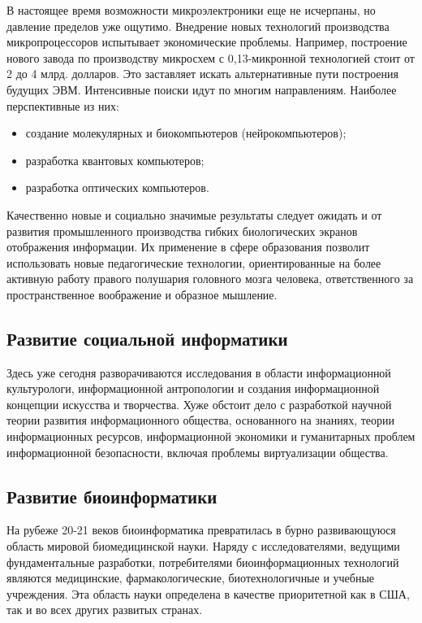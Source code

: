 В настоящее время возможности микроэлектроники еще не исчерпаны, но давление пределов уже ощутимо. Внедрение новых технологий производства микропроцессоров испытывает экономические проблемы. Например, построение нового завода по производству микросхем с 0,13-микронной технологией стоит от 2 до 4 млрд. долларов. Это заставляет искать альтернативные пути построения будущих ЭВМ. Интенсивные поиски идут по многим направлениям. Наиболее перспективные из них:
\begin{itemize}
\item создание молекулярных и биокомпьютеров (нейрокомпьютеров);
\item разработка квантовых компьютеров;
\item разработка оптических компьютеров.
\end{itemize}

Качественно новые и социально значимые результаты следует ожидать и от развития промышленного производства гибких биологических экранов отображения информации. Их применение в сфере образования позволит использовать новые педагогические технологии, ориентированные на более активную работу правого полушария головного мозга человека, ответственного за пространственное воображение и образное мышление\cite{bib105}.


\subsection{Развитие социальной информатики} \label{sect2_2_3}

Здесь уже сегодня разворачиваются исследования в области информационной культурологи, информационной антропологии и создания информационной концепции искусства и творчества. Хуже обстоит дело с разработкой научной теории развития информационного общества, основанного на знаниях, теории информационных ресурсов, информационной экономики и гуманитарных проблем информационной безопасности, включая проблемы виртуализации общества.

\subsection{Развитие биоинформатики} \label{sect2_2_3}

На рубеже 20-21 веков биоинформатика превратилась в бурно развивающуюся область мировой биомедицинской науки. Наряду с исследователями, ведущими фундаментальные разработки, потребителями биоинформационных технологий являются медицинские, фармакологические, биотехнологичные и учебные учреждения. Эта область науки определена в качестве приоритетной как в США, так и во всех других развитых странах. 

